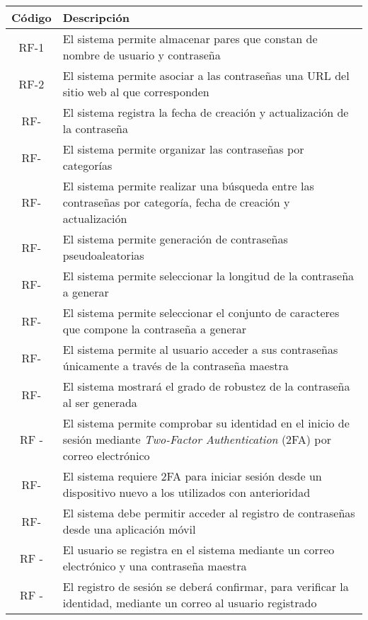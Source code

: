 \documentclass{article}
\begin{document}
\begin{table}[H]
    \centering
    \begin{tabular}{| c | p{30em} |}
        \hline
        Código &  Descripción  \\ \hline
        RF-1   & El sistema permite almacenar pares que constan de nombre de usuario y contraseña  \\ \hline
        RF-2   & El sistema permite asociar a las contraseñas una URL del sitio web al que corresponden \\ \hline
        RF-    & El sistema registra la fecha de creación y actualización de la contraseña \\ \hline
        RF- & El  sistema permite organizar las contraseñas por categorías \\ \hline
        RF- & El sistema permite realizar una búsqueda entre las contraseñas por categoría, fecha de creación y actualización  \\ \hline
        RF- & El sistema permite generación de contraseñas pseudoaleatorias \\ \hline
        RF- & El sistema permite seleccionar la longitud de la contraseña a generar\\ \hline
        RF- & El sistema permite seleccionar el conjunto de caracteres que compone la contraseña a generar\\ \hline
        RF- & El sistema permite al usuario acceder a sus contraseñas únicamente a través de la contraseña maestra \\ \hline
        RF- & El sistema mostrará el grado de robustez de la contraseña al ser generada \\ \hline 
        RF - & El sistema permite comprobar su identidad en el inicio de sesión mediante \textit{Two-Factor Authentication} (2FA) por correo electrónico \\ \hline
        RF- & El sistema requiere 2FA para iniciar sesión desde un dispositivo nuevo a los utilizados con anterioridad \\ \hline
        RF- & El sistema debe permitir acceder al registro de contraseñas desde una aplicación móvil  \\ \hline
        RF - & El usuario se registra en el sistema mediante un correo electrónico y una contraseña maestra\\ \hline
        RF - & El registro de sesión se deberá confirmar, para verificar la identidad, mediante un correo al usuario registrado \\ \hline
    \end{tabular}
\end{table}
\end{document}

